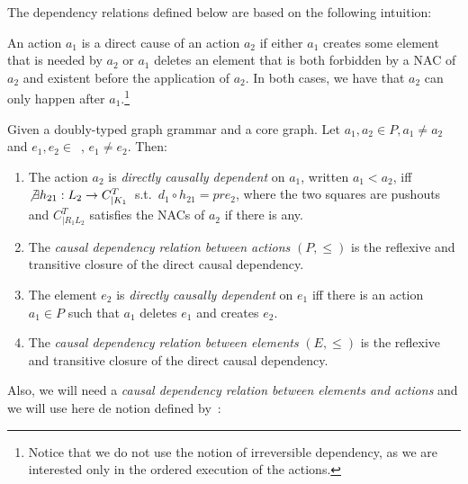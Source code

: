 The dependency relations defined below are based on the following intuition:

\begin{intuition} An action $a_1$ is a direct cause of an action $a_2$ if either $a_1$ creates some element that is needed by $a_2$ or $a_1$ deletes an element that is both forbidden by a NAC of $a_2$ and existent before the application of $a_2$. In both cases, we have that $a_2$ can only happen after $a_1$.\footnote{Notice that we do not use the notion of irreversible dependency, as we are interested only in the ordered execution of the actions.} 
\end{intuition}

\begin{definition} Given \doublyTypedGraphGrammarCore{} a doubly-typed graph grammar and \coreGraph{} a core graph. Let $a_1, a_2 \in P, a_1 \ne a_2$ and \mbox{$e_1, e_2 \in $ \coreGraph{},} $e_1 \ne e_2$. Then: 

  \begin{enumerate}
    \item The action $a_2$ is \emph{directly causally dependent} on $a_1$, written $a_1 < a_2$, iff \mbox{$\not\exists h_{21} : L_2 \rightarrow C^T_{|K_1}$ s.t. \mbox{$d_1 \circ h_{21} = pre_2$}}, where the two squares are pushouts and $C^T_{|R_1L_2}$ satisfies the NACs of $a_2$ if there is any.

   \item The \emph{causal dependency relation between actions} $(P, \leq)$ is the reflexive and transitive closure of the direct causal dependency.
     \item The element $e_2$ is \emph{directly causally dependent} on $e_1$ iff there is an action $a_1 \in P$ such that $a_1$ deletes $e_1$ and creates $e_2$.
    \item The \emph{causal dependency relation between elements} $(E, \leq)$ is the reflexive and transitive closure of the direct causal dependency.
  \end{enumerate}

  Also, we will need a \emph{causal dependency relation between elements and actions} and we will use here de notion defined by~\cite{Corradini1996}:


\end{definition}
